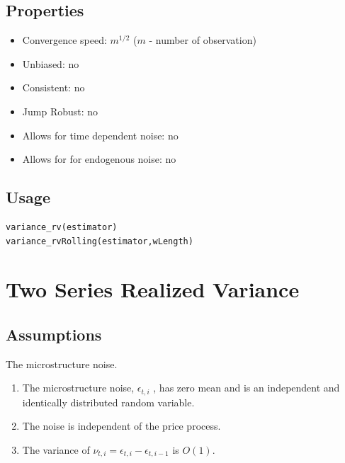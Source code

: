 \documentclass[letterpaper]{report}
\begin{document}
\subsection{Properties}
\begin{itemize}
\item Convergence speed: $m^{1/2}$ ($m$ - number of observation)
\item Unbiased: no
\item Consistent: no
\item Jump Robust: no
\item Allows for time dependent noise: no
\item Allows for for endogenous noise: no
\end{itemize}
\subsection{Usage}
\begin{lstlisting}
variance_rv(estimator)
variance_rvRolling(estimator,wLength)
\end{lstlisting}
 
 
\section{Two Series Realized Variance}
\subsection{Assumptions}
The microstructure noise.
\begin{enumerate}
\item The microstructure noise, $\epsilon_{t,i}$ , has zero mean and is an
independent and identically distributed random variable.
\item The noise is independent of the price process.
\item  The variance of $\nu_{t,i} = \epsilon_{t,i} - \epsilon_{t,i-1}$ is
$O(1)$.
\end{enumerate}
\end{document}
